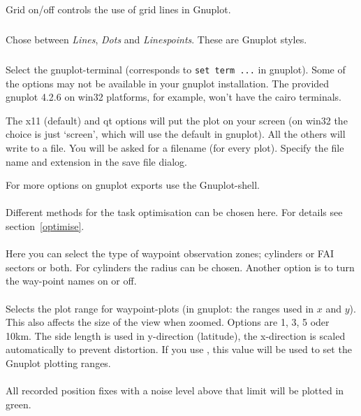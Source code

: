 Grid on/off controls the use of grid lines in Gnuplot.

\subparagraph{
}
Chose between \emph{Lines}, \emph{Dots} and \emph{Linespoints}. These are Gnuplot styles.


\subparagraph{
}
Select the gnuplot-terminal (corresponds to \texttt{set term ...} in gnuplot).
Some of the options may not be available in your gnuplot installation.
The provided gnuplot 4.2.6 on win32 platforms, for example, won't have the cairo terminals.

The x11 (default) and qt options will put the plot on your screen (on win32 the choice is just `screen',
which will use the default in gnuplot).
All the others will write to a file. You will be asked for a filename (for
every plot). Specify the file name and extension in the save file dialog.

For more options on gnuplot exports use the Gnuplot-shell.


\paragraph{
}
Different methods for the task optimisation can be chosen here. For details see section~\ref{optimise}.

\paragraph{
}
Here you can select the type of waypoint observation zones; cylinders or FAI
sectors or both. For cylinders the radius can be chosen. Another option is to
turn the way-point names on or off.


\paragraph{}
Selects the plot range for waypoint-plots (in gnuplot: the ranges used in $x$ and $y$).
This also affects the size of the view when zoomed.
Options are 1, 3, 5 oder 10km. The side length
is used in y-direction (latitude), the x-direction is scaled automatically to
prevent distortion.
If you use , this value will be used to set the
Gnuplot plotting ranges.

\paragraph{}
All recorded position fixes with a noise level above that limit will be
plotted in green.

